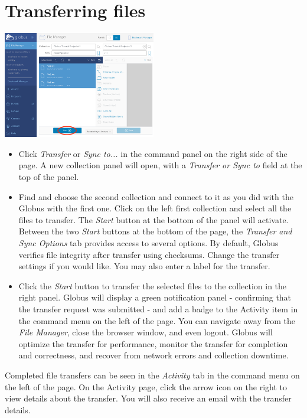 \section{Transferring files}\label{file-transfer}

\begin{center}
\includegraphics[width=0.5\textwidth]{img/filetransfer-2.png}
\end{center}

\begin{itemize}
\item Click \emph{Transfer} or \emph{Sync to...} in the command panel on the right side of the page. A new collection panel will open, with a \emph{Transfer or Sync to} field at the top of the panel.
\item Find and choose the second collection and connect to it as you did with the Globus with the first one. Click on the left first collection and select all the files to transfer. The \emph{Start} button at the bottom of the panel will activate.
Between the two \emph{Start} buttons at the bottom of the page, the \emph{Transfer and Sync Options} tab provides access to several options. By default, Globus verifies file integrity after transfer using checksums. Change the transfer settings if you would like. You may also enter a label for the transfer.
\item Click the \emph{Start} button to transfer the selected files to the collection in the right panel. Globus will display a green notification panel - confirming that the transfer request was submitted - and add a badge to the Activity item in the command menu on the left of the page.
You can navigate away from the \emph{File Manager}, close the browser window, and even logout. Globus will optimize the transfer for performance, monitor the transfer for completion and correctness, and recover from network errors and collection downtime.
\end{itemize}

Completed file transfers can be seen in the \emph{Activity} tab in the command menu on the left of the page. On the Activity page, click the arrow icon on the right to view details about the transfer. You will also receive an email with the transfer details.

